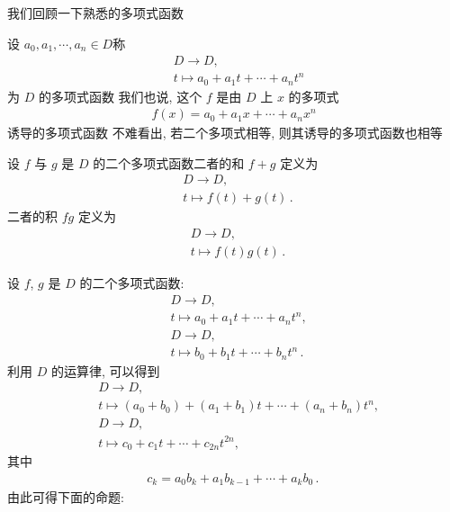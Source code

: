 \subsection*{\RootsOfPolynomials}
\markright{\RootsOfPolynomials}

我们回顾一下熟悉的多项式函数\period

\begin{definition}
    设 $a_0, a_1, \cdots, a_n \in D$\period 称
    \begin{align*}
         & D \to D, \tag*{$f \colon$}               \\
         & t \mapsto a_0 + a_1 t + \cdots + a_n t^n
    \end{align*}
    为 $D$ 的多项式函数 \period 我们也说, 这个 $f$ 是由 $D$ 上 $x$ 的多项式
    \begin{align*}
        f(x) = a_0 + a_1 x + \cdots + a_n x^n
    \end{align*}
    诱导的多项式函数 \period 不难看出, 若二个多项式相等, 则其诱导的多项式函数也相等\period
\end{definition}

\begin{definition}
    设 $f$ 与 $g$ 是 $D$ 的二个多项式函数\period 二者的和 $f+g$ 定义为
    \begin{align*}
         & D \to D, \tag*{$f+g \colon$}  \\
         & t \mapsto f(t) + g(t) \period
    \end{align*}
    二者的积 $fg$ 定义为
    \begin{align*}
         & D \to D, \tag*{$fg \colon$} \\
         & t \mapsto f(t) g(t) \period
    \end{align*}
\end{definition}

设 $f$, $g$ 是 $D$ 的二个多项式函数:
\begin{align*}
     & D \to D, \tag*{$f \colon$}                       \\
     & t \mapsto a_0 + a_1 t + \cdots + a_n t^n,        \\
     & D \to D, \tag*{$g \colon$}                       \\
     & t \mapsto b_0 + b_1 t + \cdots + b_n t^n \period
\end{align*}
利用 $D$ 的运算律, 可以得到
\begin{align*}
     & D \to D, \tag*{$f+g \colon$}                                      \\
     & t \mapsto (a_0 + b_0) + (a_1 + b_1) t + \cdots + (a_n + b_n) t^n, \\
     & D \to D, \tag*{$fg \colon$}                                       \\
     & t \mapsto c_0 + c_1 t + \cdots + c_{2n} t^{2n},
\end{align*}
其中
\begin{align*}
    c_k = a_0 b_k + a_1 b_{k-1} + \cdots + a_k b_0 \period
\end{align*}
由此可得下面的命题:

